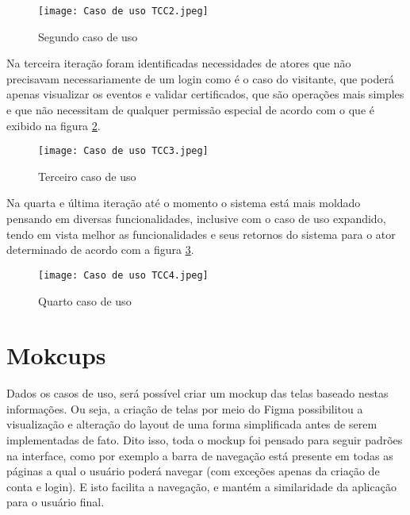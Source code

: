 \begin{figure}[H]
    \caption{\label{caso_uso_2}Segundo caso de uso}
    \vspace{5pt}
    \centering
    \texttt{[image: Caso de uso TCC2.jpeg]}
    \vspace{5pt}
\end{figure}

Na terceira iteração foram identificadas necessidades de atores que não precisavam necessariamente de um login como é o caso do visitante, que poderá apenas visualizar os eventos e validar certificados, que são operações mais simples e que não necessitam de qualquer permissão especial de acordo com o que é exibido na figura \ref{caso_uso_3}. 

\begin{figure}[H]
    \caption{\label{caso_uso_3}Terceiro caso de uso}
    \vspace{5pt}
    \centering
    \texttt{[image: Caso de uso TCC3.jpeg]}
    \vspace{5pt}
\end{figure}

Na quarta e última iteração até o momento o sistema está mais moldado pensando em diversas funcionalidades, inclusive com o caso de uso expandido, tendo em vista melhor as funcionalidades e seus retornos do sistema para o ator determinado de acordo com a figura \ref{caso_uso_4}.

\begin{figure}[H]
    \caption{\label{caso_uso_4}Quarto caso de uso}
    \vspace{5pt}
    \centering
    \texttt{[image: Caso de uso TCC4.jpeg]}
    \vspace{5pt}
\end{figure}


\section{Mokcups}
Dados os casos de uso, será possível criar um mockup das telas baseado nestas informações. Ou seja, a criação de telas por meio do Figma possibilitou a visualização e alteração do layout de uma forma simplificada antes de serem implementadas de fato. Dito isso, toda o mockup foi pensado para seguir padrões na interface, como por exemplo a barra de navegação está presente em todas as páginas a qual o usuário poderá navegar (com exceções apenas da criação de conta e login). E isto facilita a navegação, e mantém a similaridade da aplicação para o usuário final.  


